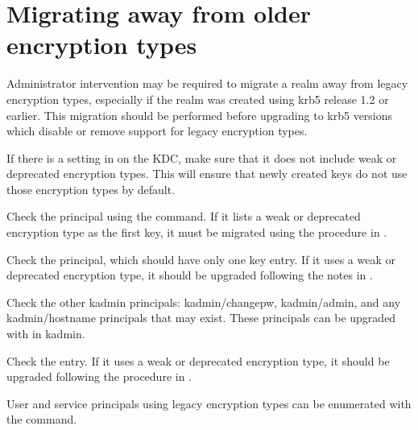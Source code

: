 \documentclass[letterpaper,10pt,english]{sphinxmanual}
\begin{document}
\section{Migrating away from older encryption types}
\label{\detokenize{admin/enctypes:migrating-away-from-older-encryption-types}}
Administrator intervention may be required to migrate a realm away
from legacy encryption types, especially if the realm was created
using krb5 release 1.2 or earlier.  This migration should be performed
before upgrading to krb5 versions which disable or remove support for
legacy encryption types.

If there is a  setting in {\hyperref[\detokenize{admin/conf_files/kdc_conf:kdc-conf-5}]{}} on
the KDC, make sure that it does not include weak or deprecated
encryption types.  This will ensure that newly created keys do not use
those encryption types by default.

Check the  principal using the {\hyperref[\detokenize{admin/admin_commands/kadmin_local:kadmin-1}]{}}
 command.  If it lists a weak or deprecated encryption
type as the first key, it must be migrated using the procedure in
{\hyperref[\detokenize{admin/database:changing-krbtgt-key}]{}}.

Check the  principal, which should have only one key
entry.  If it uses a weak or deprecated encryption type, it should be
upgraded following the notes in {\hyperref[\detokenize{admin/database:updating-history-key}]{}}.

Check the other kadmin principals: kadmin/changepw, kadmin/admin, and
any kadmin/hostname principals that may exist.  These principals can
be upgraded with  in kadmin.

Check the  entry.  If it uses a weak or deprecated encryption
type, it should be upgraded following the procedure in
{\hyperref[\detokenize{admin/database:updating-master-key}]{}}.

User and service principals using legacy encryption types can be
enumerated with the {\hyperref[\detokenize{admin/admin_commands/kdb5_util:kdb5-util-8}]{}}  command.
\end{document}
